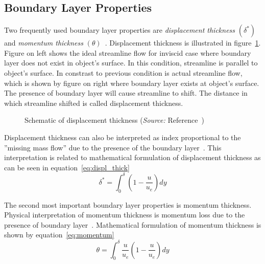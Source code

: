 \subsection{Boundary Layer Properties}
Two frequently used boundary layer properties are \emph{displacement thickness} $(\delta^*)$ and \emph{momentum thickness} $(\theta)$~\cite{JA}. Displacement thickness is illustrated in figure~\ref{fig:displ_thick}. Figure on left shows the ideal streamline flow for inviscid case where boundary layer does not exist in object's surface. In this condition, streamline is parallel to object's surface. In constrast to previous condition is actual streamline flow, which is shown by figure on right where boundary layer exists at object's surface. The presence of boundary layer will cause streamline to shift. The distance in which streamline shifted is called displacement thickness. 
   
\begin{figure}[h]
  \centering
  \caption{Schematic of displacement thickness (\emph{Source:} Reference~\cite{JA})}
  \label{fig:displ_thick}
\end{figure}

Displacement thickness can also be interpreted as index proportional to the ''missing mass flow'' due to the presence of the boundary layer~\cite{JA}. This interpretation is related to mathematical formulation of displacement thickness as can be seen in equation~\ref{eq:displ_thick}
\begin{equation}\label{eq:displ_thick}
\delta^* = \int_{0}^{\delta} \left(1-\frac{u}{u_e}\right)dy
\end{equation}

The second most important boundary layer properties is momentum thickness. Physical interpretation of momentum thickness is momentum loss due to the presence of boundary layer~\cite{PK}. Mathematical formulation of momentum thickness is shown by equation~\ref{eq:momentum}
\begin{equation}\label{eq:momentum}
\theta = \int_{0}^{\delta} \frac{u}{u_e} \left(1-\frac{u}{u_e} \right) dy
\end{equation}

